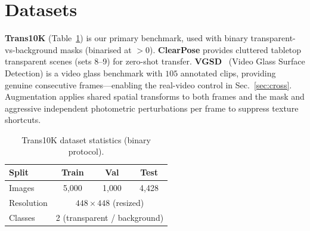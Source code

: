 \section{Datasets}
\textbf{Trans10K} \cite{xie2020translab} (Table~\ref{tab:data}) is our primary
benchmark, used with binary transparent-vs-background masks (binarised at $>0$).
\textbf{ClearPose} \cite{chen2022clearpose} provides cluttered tabletop
transparent scenes (sets 8--9) for zero-shot transfer. \textbf{VGSD}~\cite{liu2024vgsd}
(Video Glass Surface Detection) is a video glass benchmark with $105$ annotated
clips, providing genuine consecutive frames---enabling the real-video control in
Sec.~\ref{sec:cross}. Augmentation
applies shared spatial transforms to both frames and the mask and aggressive
independent photometric perturbations per frame to suppress texture shortcuts.

\begin{table}[t]
\centering
\caption{Trans10K dataset statistics (binary protocol).}
\label{tab:data}
\begin{tabular}{lccc}
\toprule
Split & Train & Val & Test \\
\midrule
Images & 5{,}000 & 1{,}000 & 4{,}428 \\
Resolution & \multicolumn{3}{c}{$448\times448$ (resized)} \\
Classes & \multicolumn{3}{c}{2 (transparent / background)} \\
\bottomrule
\end{tabular}
\end{table}


